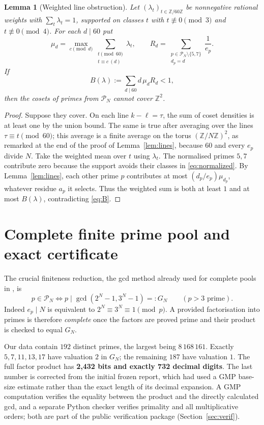 \documentclass[11pt,a4paper]{article}
\newtheorem{lemma}{Lemma}
\newcommand{\Z}{\mathbb Z}
\newcommand{\PN}{\mathcal P_N}
\begin{document}
\begin{lemma}[Weighted line obstruction]\label{lem:weighted}
Let $(\lambda_t)_{t\in\Z/60\Z}$ be nonnegative rational weights with $\sum_t\lambda_t=1$, supported on classes $t$ with $t\not\equiv0\pmod3$ and $t\not\equiv0\pmod4$. For each $d\mid60$ put
\[
  \mu_d=\max_{c\pmod d}\sum_{\substack{t\pmod{60}\\t\equiv c\ (d)}}\lambda_t,
  \qquad R_d=\sum_{\substack{p\in\PN\setminus\{5,7\}\\d_p=d}}\frac1{e_p}.
\]
If
\begin{equation}\label{eq:B}
   B(\lambda):=\sum_{d\mid60}d\,\mu_dR_d<1,
\end{equation}
then the cosets of primes from $\PN$ cannot cover $\Z^2$.
\end{lemma}
\begin{proof}
Suppose they cover. On each line $k-\ell=\tau$, the sum of coset densities is at least one by the union bound. The same is true after averaging over the lines $\tau\equiv t\pmod{60}$; this average is a finite average on the torus $(\Z/N\Z)^2$, as remarked at the end of the proof of Lemma~\ref{lem:lines}, because $60$ and every $e_p$ divide $N$. Take the weighted mean over $t$ using $\lambda_t$. The normalised primes $5,7$ contribute zero because the support avoids their classes in \eqref{eq:normalized}. By Lemma~\ref{lem:lines}, each other prime $p$ contributes at most $(d_p/e_p)\mu_{d_p}$, whatever residue $a_p$ it selects. Thus the weighted sum is both at least $1$ and at most $B(\lambda)$, contradicting \eqref{eq:B}.
\end{proof}

\section{Complete finite prime pool and exact certificate}
The crucial finiteness reduction, the gcd method already used for complete pools in \cite{Forum203,ProblemADayOct12}, is
\begin{equation}\label{eq:gcd}
 p\in\PN\iff p\mid \gcd(2^N-1,3^N-1)=:G_N\qquad(p>3\text{ prime}).
\end{equation}
Indeed $e_p\mid N$ is equivalent to $2^N\equiv3^N\equiv1\pmod p$. A provided factorisation into primes is therefore \emph{complete} once the factors are proved prime and their product is checked to equal $G_N$.

Our data contain $192$ distinct primes, the largest being $8\,168\,161$. Exactly $5,7,11,13,17$ have valuation $2$ in $G_N$; the remaining $187$ have valuation $1$. The full factor product has \textbf{2,432 bits and exactly 732 decimal digits}. The last number is corrected from the initial frozen report, which had used a GMP base-size estimate rather than the exact length of its decimal expansion. A GMP computation verifies the equality between the product and the directly calculated gcd, and a separate Python checker verifies primality and all multiplicative orders; both are part of the public verification package (Section~\ref{sec:verif}).
\end{document}
